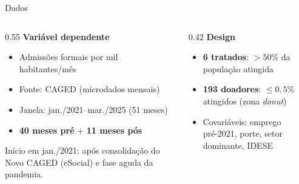 \documentclass[11pt, aspectratio=169]{beamer}
\begin{document}
\begin{frame}{Dados}

\begin{columns}[T]
\begin{column}{0.55\textwidth}
  \textbf{Variável dependente}
  \begin{itemize}
    \item Admissões formais por mil habitantes/mês
    \item Fonte: CAGED (microdados mensais)
    \item Janela: jan./2021--mar./2025 (51 meses)
    \item \textbf{40 meses pré} + \textbf{11 meses pós}
  \end{itemize}

  \medskip
  \small Início em jan./2021: após consolidação do Novo CAGED (eSocial) e fase aguda da pandemia.
\end{column}
\begin{column}{0.42\textwidth}
  \textbf{Design}
  \begin{itemize}
    \item \textbf{6 tratados}: $>50\%$ da população atingida \cite{teixeira2024}
    \item \textbf{193 doadores}: $\leq 0{,}5\%$ atingidos (zona \textit{donut})
    \item Covariáveis: emprego pré-2021, porte, setor dominante, IDESE
  \end{itemize}
\end{column}
\end{columns}

\end{frame}
\end{document}
